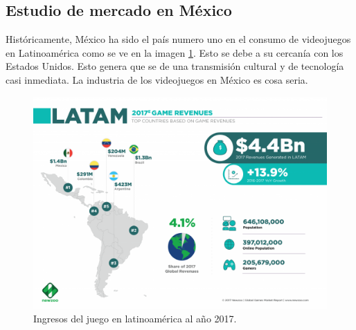 			 
\subsection{Estudio de mercado en México}

Históricamente, México ha sido el país numero uno en el consumo de videojuegos en Latinoamérica como se ve en la imagen \ref{fig:mexicoUno}. Esto se debe a su cercanía con los Estados Unidos. Esto genera que se de una transmisión cultural y de tecnología casi inmediata. La industria de los videojuegos en México es cosa seria. 
\\[1pt] 
	\begin{figure}
	\centering
	\includegraphics[width=\textwidth]{03MarcoTeorico/imageR/mexicoUno.png}
	\caption{Ingresos del juego en latinoamérica al año 2017.}
	\label{fig:mexicoUno}
	\end{figure}

